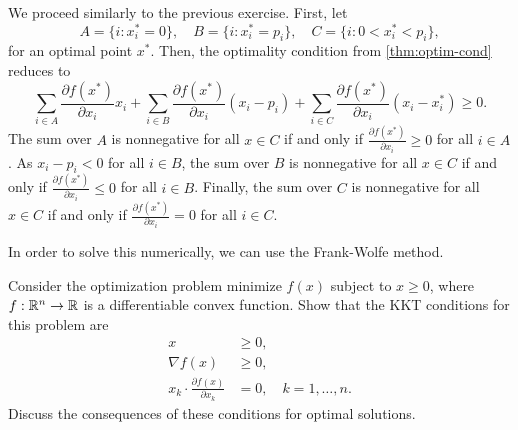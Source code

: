 \begin{solution}
  We proceed similarly to the previous exercise.
  First, let
  \begin{equation}
    A = \{ i : x^*_i = 0 \}, \quad B = \{ i : x^*_i = p_i \}, \quad C = \{ i : 0 < x^*_i < p_i \},
  \end{equation}
  for an optimal point $x^*$.
  Then, the optimality condition from \cref{thm:optim-cond} reduces to
  \begin{equation}
    \sum_{i \in A} \frac{\partial f(x^*)}{\partial x_i} x_i + \sum_{i \in B} \frac{\partial f(x^*)}{\partial x_i} (x_i - p_i) + \sum_{i \in C} \frac{\partial f(x^*)}{\partial x_i} (x_i - x^*_i) \geq 0.
  \end{equation}
  The sum over $A$ is nonnegative for all $x \in C$ if and only if $\frac{\partial f(x^*)}{\partial x_i} \geq 0$ for all $i \in A$.
  As $x_i - p_i < 0$ for all $i \in B$, the sum over $B$ is nonnegative for all $x \in C$ if and only if $\frac{\partial f(x^*)}{\partial x_i} \leq 0$ for all $i \in B$.
  Finally, the sum over $C$ is nonnegative for all $x \in C$ if and only if $\frac{\partial f(x^*)}{\partial x_i} = 0$ for all $i \in C$.

  In order to solve this numerically, we can use the Frank-Wolfe method.
\end{solution}

\begin{exercise}
  Consider the optimization problem minimize $f(x)$ subject to $x \geq 0$, where $f : \mathbb{R}^n \to \mathbb{R}$ is a differentiable convex function.
  Show that the KKT conditions for this problem are
  \begin{equation}
    \begin{split}
      x &\geq 0, \\
      \nabla f(x) &\geq 0, \\
      x_k \cdot \frac{\partial f(x)}{\partial x_k}  &= 0, \quad k = 1, \ldots, n.
    \end{split}
  \end{equation}
  Discuss the consequences of these conditions for optimal solutions.
\end{exercise}

